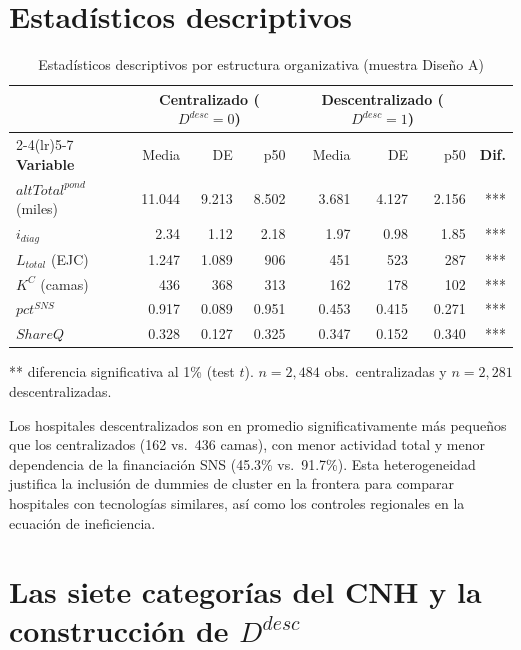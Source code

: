 \documentclass[12pt, a4paper, twoside, openright]{book}
\theoremstyle{plain}
\theoremstyle{definition}
\theoremstyle{remark}
\begin{document}
\section{Estadísticos descriptivos}

\begin{table}[htbp]
\centering
\caption{Estadísticos descriptivos por estructura organizativa (muestra Diseño A)}
\label{tab:descriptivos}
\begin{threeparttable}
\small
\begin{tabular}{lrrrrrrr}
\toprule
& \multicolumn{3}{c}{\textbf{Centralizado ($D^{desc}=0$)}}
& \multicolumn{3}{c}{\textbf{Descentralizado ($D^{desc}=1$)}} & \\
\cmidrule(lr){2-4}\cmidrule(lr){5-7}
\textbf{Variable} & Media & DE & p50
  & Media & DE & p50 & \textbf{Dif.} \\
\midrule
$altTotal^{pond}$ (miles) & 11.044 & 9.213 & 8.502
  & 3.681 & 4.127 & 2.156 & *** \\
$i_{diag}$ & 2.34 & 1.12 & 2.18
  & 1.97 & 0.98 & 1.85 & *** \\
$L_{total}$ (EJC) & 1.247 & 1.089 & 906
  & 451 & 523 & 287 & *** \\
$K^C$ (camas) & 436 & 368 & 313
  & 162 & 178 & 102 & *** \\
$pct^{SNS}$ & 0.917 & 0.089 & 0.951
  & 0.453 & 0.415 & 0.271 & *** \\
$ShareQ$ & 0.328 & 0.127 & 0.325
  & 0.347 & 0.152 & 0.340 & *** \\
\bottomrule
\end{tabular}
\begin{tablenotes}
  \small
  \item *** diferencia significativa al 1\% (test $t$). $n = 2{,}484$ obs.\ centralizadas y $n = 2{,}281$ descentralizadas.
\end{tablenotes}
\end{threeparttable}
\end{table}

Los hospitales descentralizados son en promedio significativamente más pequeños que los centralizados (162 vs.\ 436 camas), con menor actividad total y menor dependencia de la financiación SNS (45.3\% vs.\ 91.7\%). Esta heterogeneidad justifica la inclusión de dummies de cluster en la frontera para comparar hospitales con tecnologías similares, así como los controles regionales en la ecuación de ineficiencia.

\section{Las siete categorías del CNH y la construcción de \texorpdfstring{$D^{desc}$}{D\^{}desc}}
\label{sec:categorias_cnh}
\end{document}
